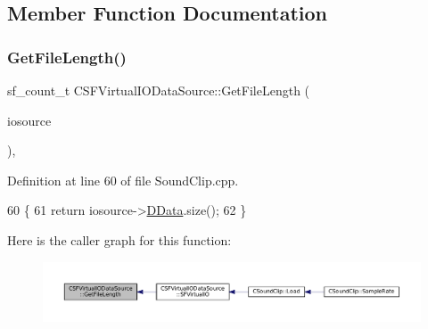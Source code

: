 \subsection{Member Function Documentation}
\hypertarget{classCSFVirtualIODataSource_a94ee0d9f4703661ca7f2cad8cf294690}{}\label{classCSFVirtualIODataSource_a94ee0d9f4703661ca7f2cad8cf294690} 
\subsubsection{\texorpdfstring{Get\+File\+Length()}{GetFileLength()}}
{\footnotesize\ttfamily sf\+\_\+count\+\_\+t C\+S\+F\+Virtual\+I\+O\+Data\+Source\+::\+Get\+File\+Length (\begin{DoxyParamCaption}\item[{\hyperlink{classCSFVirtualIODataSource}{C\+S\+F\+Virtual\+I\+O\+Data\+Source} $\ast$}]{iosource }\end{DoxyParamCaption})\hspace{0.3cm}{\ttfamily [static]}, {\ttfamily [protected]}}



Definition at line 60 of file Sound\+Clip.\+cpp.


\begin{DoxyCode}
60                                                                                 \{
61     \textcolor{keywordflow}{return} iosource->\hyperlink{classCSFVirtualIODataSource_ac03be5c46b6647150e12edc04fa52ede}{DData}.size();
62 \}
\end{DoxyCode}
Here is the caller graph for this function\+:
\nopagebreak
\begin{figure}[H]
\begin{center}
\leavevmode
\includegraphics[width=350pt]{classCSFVirtualIODataSource_a94ee0d9f4703661ca7f2cad8cf294690_icgraph}
\end{center}
\end{figure}
\hypertarget{classCSFVirtualIODataSource_a40021962590f0911d8af1020397fbba1}{}\label{classCSFVirtualIODataSource_a40021962590f0911d8af1020397fbba1} 
